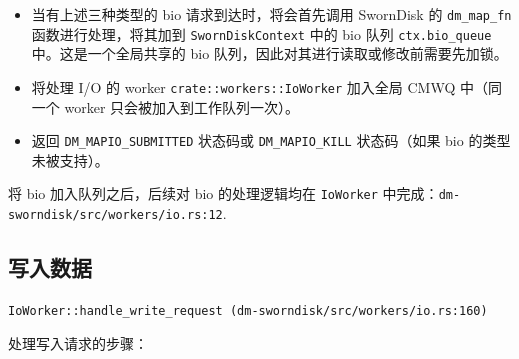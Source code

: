 \begin{itemize}[itemsep=2pt,topsep=0pt,parsep=0pt]
  \item 当有上述三种类型的 bio 请求到达时，将会首先调用 SwornDisk 的 \texttt{dm_map_fn} 函数进行处理，将其加到 \texttt{SwornDiskContext} 中的 bio 队列 \texttt{ctx.bio_queue}  中。这是一个全局共享的 bio 队列，因此对其进行读取或修改前需要先加锁。
  \item 将处理 I/O 的 worker \texttt{crate::workers::IoWorker} 加入全局 CMWQ 中（同一个 worker 只会被加入到工作队列一次）。
  \item 返回 \texttt{DM_MAPIO_SUBMITTED} 状态码或 \texttt{DM_MAPIO_KILL} 状态码（如果 bio 的类型未被支持）。
\end{itemize}

将 bio 加入队列之后，后续对 bio 的处理逻辑均在 \texttt{IoWorker} 中完成：\texttt{dm-sworndisk/src/workers/io.rs:12}.

\subsection{写入数据}

\texttt{IoWorker::handle_write_request (dm-sworndisk/src/workers/io.rs:160)}

处理写入请求的步骤：

